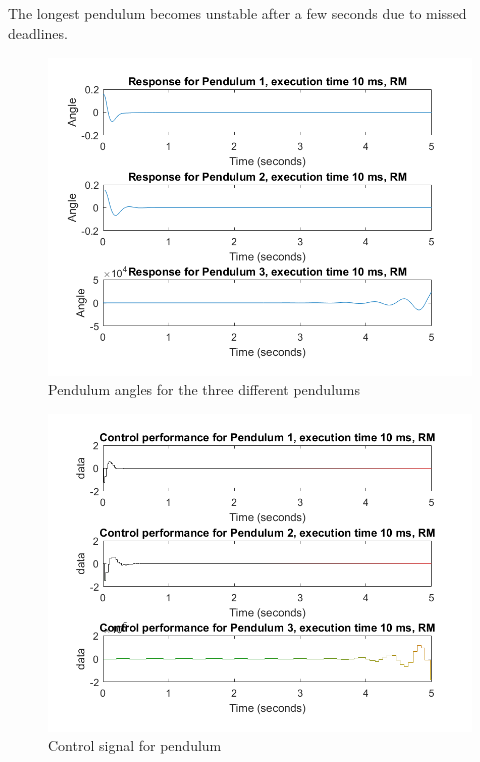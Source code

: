 \documentclass[12pt,a4paper]{article}
\begin{document}
\subsection{} %
The longest pendulum becomes unstable after a few seconds due to missed deadlines.
\begin{center}
      \begin{figure}[H]
      \centering
        \includegraphics[scale=0.5]{ex531.png}
        \caption{Pendulum angles for the three different pendulums}
        \label{fig:ex31}
      \end{figure}
    \end{center}
    
    \begin{center}
      \begin{figure}[H]
      \centering
        \includegraphics[scale=0.5]{ex532.png}
      \caption{Control signal for pendulum}
        \label{fig:ex32}
      \end{figure}
    \end{center}
    
\end{document}
